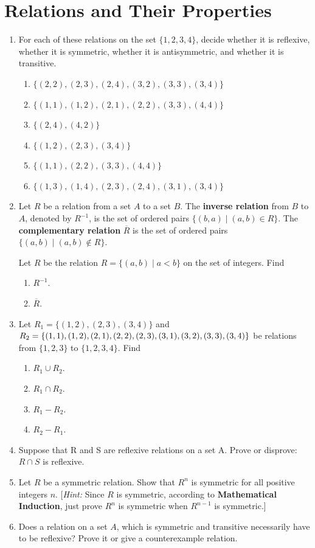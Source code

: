 \documentclass{sig-alternate-05-2015}
\begin{document}
\section{Relations and Their Properties}
\begin{enumerate}
\item For each of these relations on the set $\{1, 2, 3, 4\}$, decide
whether it is reflexive, whether it is symmetric, whether
it is antisymmetric, and whether it is transitive.
\begin{enumerate}
\item $\{(2, 2), (2, 3), (2, 4), (3, 2), (3, 3), (3, 4)\}$
\item $\{(1, 1), (1, 2), (2, 1), (2, 2), (3, 3), (4, 4)\}$
\item $\{(2, 4), (4, 2)\}$
\item $\{(1, 2), (2, 3), (3, 4)\}$
\item $\{(1, 1), (2, 2), (3, 3), (4, 4)\}$
\item $\{(1, 3), (1, 4), (2, 3), (2, 4), (3, 1), (3, 4)\}$
\end{enumerate}
\item 
Let $R$ be a relation from a set $A$ to a set $B$. The \textbf{inverse relation}
from $B$ to $A$, denoted by $R^{-1}$, is the set of ordered pairs
$\{(b, a) \mid (a, b) \in R\}$. The \textbf{complementary relation} $\overline{R}$ is the
set of ordered pairs $\{(a, b) \mid (a, b) \notin R\}$.

Let $R$ be the relation $R = \{(a, b) \mid a < b\}$ on the set of
integers. Find
\begin{enumerate}
	\item $R^{-1}$.
	\item $\overline{R}$.
\end{enumerate}
\item Let $R_1 = \{(1, 2), (2, 3), (3, 4)\}$ and $R_2 = \{(1, 1), (1, 2),\\
(2, 1), (2, 2), (2, 3), (3, 1), (3, 2), (3, 3), (3, 4)\}$ be relations
from $\{1, 2, 3\}$ to $\{1, 2, 3, 4\}$. Find
\begin{enumerate}
\item $R_1\cup R_2$. 
\item $R_1 \cap R_2$.
\item $R_1-R_2$. 
\item $R_2-R_1$.
\end{enumerate}
\item Suppose that R and S are reflexive relations on a set A.
Prove or disprove: $R \cap S$ is reflexive.

\item Let $R$ be a symmetric relation. Show that $R^n$ is symmetric for all positive integers $n$. [\textit{Hint:} Since $R$ is symmetric, according to \textbf{Mathematical Induction}, just prove $R^n$ is symmetric when $R^{n - 1}$ is symmetric.]

\item Does a relation on a set $A$, which is symmetric and transitive necessarily
have to be reflexive? Prove it or give a counterexample relation.
\end{enumerate}
\end{document}
